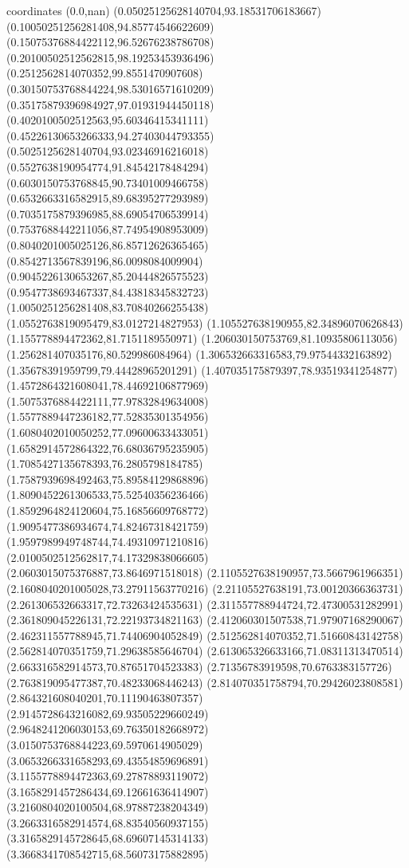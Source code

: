 coordinates {%
(0.0,nan)
(0.05025125628140704,93.18531706183667)
(0.10050251256281408,94.85774546622609)
(0.15075376884422112,96.52676238786708)
(0.20100502512562815,98.19253453936496)
(0.2512562814070352,99.8551470907608)
(0.30150753768844224,98.53016571610209)
(0.35175879396984927,97.01931944450118)
(0.4020100502512563,95.60346415341111)
(0.45226130653266333,94.27403044793355)
(0.5025125628140704,93.02346916216018)
(0.5527638190954774,91.84542178484294)
(0.6030150753768845,90.73401009466758)
(0.6532663316582915,89.68395277293989)
(0.7035175879396985,88.69054706539914)
(0.7537688442211056,87.74954908953009)
(0.8040201005025126,86.85712626365465)
(0.8542713567839196,86.0098084009904)
(0.9045226130653267,85.20444826575523)
(0.9547738693467337,84.43818345832723)
(1.0050251256281408,83.70840266255438)
(1.0552763819095479,83.0127214827953)
(1.105527638190955,82.34896070626843)
(1.155778894472362,81.7151189550971)
(1.206030150753769,81.10935806113056)
(1.256281407035176,80.529986084964)
(1.306532663316583,79.97544332163892)
(1.35678391959799,79.44428965201291)
(1.407035175879397,78.93519341254877)
(1.4572864321608041,78.44692106877969)
(1.5075376884422111,77.97832849634008)
(1.5577889447236182,77.52835301354956)
(1.6080402010050252,77.09600633433051)
(1.6582914572864322,76.68036795235905)
(1.7085427135678393,76.2805798184785)
(1.7587939698492463,75.89584129868896)
(1.8090452261306533,75.52540356236466)
(1.8592964824120604,75.16856609768772)
(1.9095477386934674,74.82467318421759)
(1.9597989949748744,74.49310971210816)
(2.0100502512562817,74.17329838066605)
(2.0603015075376887,73.8646971518018)
(2.1105527638190957,73.5667961966351)
(2.1608040201005028,73.27911563770216)
(2.21105527638191,73.00120366363731)
(2.261306532663317,72.73263424535631)
(2.311557788944724,72.47300531282991)
(2.361809045226131,72.22193734821163)
(2.412060301507538,71.97907168290067)
(2.462311557788945,71.74406904052849)
(2.512562814070352,71.51660843142758)
(2.562814070351759,71.29638585646704)
(2.613065326633166,71.08311313470514)
(2.663316582914573,70.87651704523383)
(2.71356783919598,70.6763383157726)
(2.763819095477387,70.48233068446243)
(2.814070351758794,70.29426023808581)
(2.864321608040201,70.11190463807357)
(2.9145728643216082,69.93505229660249)
(2.9648241206030153,69.76350182668972)
(3.0150753768844223,69.5970614905029)
(3.0653266331658293,69.43554859696891)
(3.1155778894472363,69.27878893119072)
(3.1658291457286434,69.12661636414907)
(3.2160804020100504,68.97887238204349)
(3.2663316582914574,68.83540560937155)
(3.3165829145728645,68.69607145314133)
(3.3668341708542715,68.56073175882895)
}
